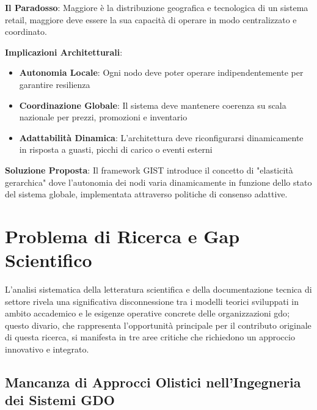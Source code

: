 \begin{tcolorbox}[
    colback=blue!5!white,
    colframe=blue!75!black,
    title={\textbf{Innovation Box 1.1:} Il Paradosso della Complessità Sistemica nella \gls{gdo}},
    fonttitle=\bfseries,
    boxrule=1.5pt,
    arc=2mm,
    breakable
]
\textbf{Il Paradosso}: Maggiore è la distribuzione geografica e tecnologica di un sistema retail, maggiore deve essere la sua capacità di operare in modo centralizzato e coordinato.

\vspace{0.3cm}
\textbf{Implicazioni Architetturali}:
\begin{itemize}
    \item \textbf{Autonomia Locale}: Ogni nodo deve poter operare indipendentemente per garantire resilienza
    \item \textbf{Coordinazione Globale}: Il sistema deve mantenere coerenza su scala nazionale per prezzi, promozioni e inventario
    \item \textbf{Adattabilità Dinamica}: L'architettura deve riconfigurarsi dinamicamente in risposta a guasti, picchi di carico o eventi esterni
\end{itemize}

\vspace{0.3cm}
\textbf{Soluzione Proposta}: Il framework GIST introduce il concetto di "elasticità gerarchica" dove l'autonomia dei nodi varia dinamicamente in funzione dello stato del sistema globale, implementata attraverso politiche di consenso adattive.
\end{tcolorbox}

\section{Problema di Ricerca e Gap Scientifico}
\label{sec:problema_ricerca}

L'analisi sistematica della letteratura scientifica e della documentazione tecnica di settore rivela una significativa disconnessione tra i modelli teorici sviluppati in ambito accademico e le esigenze operative concrete delle organizzazioni \gls{gdo}; questo divario, che rappresenta l'opportunità principale per il contributo originale di questa ricerca, si manifesta in tre aree critiche che richiedono un approccio innovativo e integrato.

\subsection{Mancanza di Approcci Olistici nell'Ingegneria dei Sistemi GDO}

